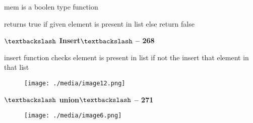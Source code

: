 \documentclass[12pt]{article}
\renewcommand{\_}{\kern-1.5pt\textunderscore\kern-1.5pt}
\begin{document}

\par


\vspace{\baselineskip}
{\fontsize{14pt}{16.8pt}\selectfont mem is a boolen type function\par}\par

{\fontsize{14pt}{16.8pt}\selectfont returns true if given element is present in list else return false\par}\par


\vspace{\baselineskip}
{\fontsize{14pt}{16.8pt}\selectfont \textbf{$\textbackslash$  Insert$\textbackslash$ -- 268}\par}\par


\vspace{\baselineskip}
{\fontsize{14pt}{16.8pt}\selectfont insert function checks element is present in list if not the insert that element in that list\par}\par




\begin{figure}[H]
	\begin{Center}
		\texttt{[image: ./media/image12.png]}
	\end{Center}
\end{figure}



\par


\vspace{\baselineskip}

\vspace{\baselineskip}
{\fontsize{14pt}{16.8pt}\selectfont \textbf{$\textbackslash$ union$\textbackslash$  -- 271}\par}\par




\begin{figure}[H]
	\begin{Center}
		\texttt{[image: ./media/image6.png]}
	\end{Center}
\end{figure}
\end{document}
